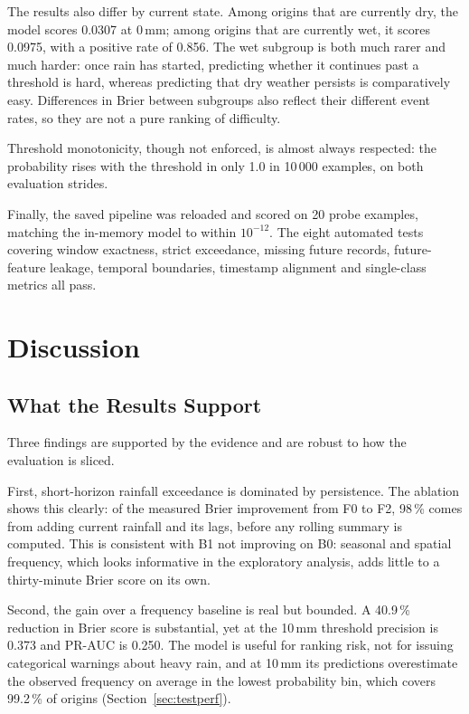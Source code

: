 \documentclass[10pt,a4paper,twocolumn,twoside]{rho-class/rho}
\begin{document}
The results also differ by current state. Among origins that are currently dry, the model scores 0.0307 at 0\,mm; among origins that are currently wet, it scores 0.0975, with a positive rate of 0.856. The wet subgroup is both much rarer and much harder: once rain has started, predicting whether it continues past a threshold is hard, whereas predicting that dry weather persists is comparatively easy. Differences in Brier between subgroups also reflect their different event rates, so they are not a pure ranking of difficulty.

Threshold monotonicity, though not enforced, is almost always respected: the probability rises with the threshold in only 1.0 in 10\,000 examples, on both evaluation strides.

Finally, the saved pipeline was reloaded and scored on 20 probe examples, matching the in-memory model to within $10^{-12}$. The eight automated tests covering window exactness, strict exceedance, missing future records, future-feature leakage, temporal boundaries, timestamp alignment and single-class metrics all pass.

\section{Discussion}
\label{sec:disc}

\subsection{What the Results Support}
Three findings are supported by the evidence and are robust to how the evaluation is sliced.

First, short-horizon rainfall exceedance is dominated by persistence. The ablation shows this clearly: of the measured Brier improvement from F0 to F2, 98\,\% comes from adding current rainfall and its lags, before any rolling summary is computed. This is consistent with B1 not improving on B0: seasonal and spatial frequency, which looks informative in the exploratory analysis, adds little to a thirty-minute Brier score on its own.

Second, the gain over a frequency baseline is real but bounded. A 40.9\,\% reduction in Brier score is substantial, yet at the 10\,mm threshold precision is 0.373 and PR-AUC is 0.250. The model is useful for ranking risk, not for issuing categorical warnings about heavy rain, and at 10\,mm its predictions overestimate the observed frequency on average in the lowest probability bin, which covers 99.2\,\% of origins (Section~\ref{sec:testperf}).
\end{document}
